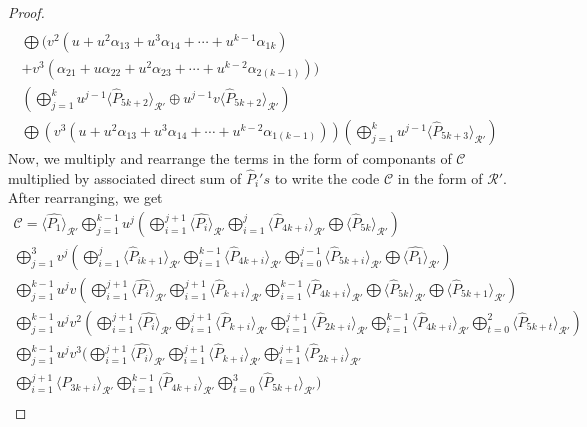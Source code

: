 \documentclass{amsart}
\theoremstyle{definition}
\theoremstyle{remark}
\numberwithin{equation}{section}
\begin{document}
\begin{proof}
\begin{gather*}
     \\  \bigoplus (v^2(u + u^2\alpha_{13} + u^3\alpha_{14} + \cdots + u^{k-1}\alpha_{1k})
       \\+ v^3( \alpha_{21} + u\alpha_{22} + u^2\alpha_{23}  + \cdots + u^{k-2}\alpha_{2(k-1)})) \\
     \left( \bigoplus_{j=1}^{k}  u^{j-1}\langle \hat{P}_{5k+2} \rangle_{\mathcal{R}'}
      \oplus u^{j-1}v\langle \hat{P}_{5k+2} \rangle_{\mathcal{R}'}\right)
     \\  \bigoplus  (v^3(u + u^2\alpha_{13} + u^3\alpha_{14} + \cdots + u^{k-2}\alpha_{1(k-1)}))
     \left( \bigoplus_{j=1}^{k}  u^{j-1}\langle \hat{P}_{5k+3} \rangle_{\mathcal{R}'}\right)
		\end{gather*}
{Now, we multiply and rearrange the terms in the form of componants of $\mathcal{C}$ multiplied by associated direct sum of $\hat{P}_{i}'s$ to write the code $\mathcal{C}$ in the form of $\mathcal{R}'.$ After rearranging, we get}
 \allowdisplaybreaks
    \begin{gather*}
        \mathcal{C} = \langle \hat{P_{1}} \rangle_{\mathcal{R}'} \bigoplus_{j=1}^{k-1} u^{j} \left( \bigoplus_{i=1}^{j+1} \langle \hat{P_i} \rangle_{\mathcal{R}'} \bigoplus_{i=1}^{j} \langle \hat{P}_{4k+i} \rangle_{\mathcal{R}'} \bigoplus \langle \hat{P}_{5k} \rangle_{\mathcal{R}'}  \right) \\
         \bigoplus_{j=1}^{3} v^{j} \left( \bigoplus_{i=1}^{j} \langle \hat{P}_{ik+1} \rangle_{\mathcal{R}'} \bigoplus_{i=1}^{k-1} \langle \hat{P}_{4k+i} \rangle_{\mathcal{R}'} \bigoplus_{i=0}^{j-1} \langle \hat{P}_{5k+i} \rangle_{\mathcal{R}'} \bigoplus \langle \hat{P_{1}} \rangle_{\mathcal{R}'}  \right) \\
          \bigoplus_{j=1}^{k-1} u^{j}v \left( \bigoplus_{i=1}^{j+1} \langle \hat{P_{i}} \rangle_{\mathcal{R}'} \bigoplus_{i=1}^{j+1} \langle \hat{P}_{k+i} \rangle_{\mathcal{R}'} \bigoplus_{i=1}^{k-1} \langle \hat{P}_{4k+i} \rangle_{\mathcal{R}'} \bigoplus \langle \hat{P}_{5k} \rangle_{\mathcal{R}'} \bigoplus \langle \hat{P}_{5k+1} \rangle_{\mathcal{R}'}  \right) \\
           \bigoplus_{j=1}^{k-1} u^{j}v^2 \left( \bigoplus_{i=1}^{j+1} \langle \hat{P_{i}} \rangle_{\mathcal{R}'} \bigoplus_{i=1}^{j+1} \langle \hat{P}_{k+i} \rangle_{\mathcal{R}'}  \bigoplus_{i=1}^{j+1} \langle \hat{P}_{2k+i} \rangle_{\mathcal{R}'} \bigoplus_{i=1}^{k-1} \langle \hat{P}_{4k+i} \rangle_{\mathcal{R}'} \bigoplus_{t=0}^{2} \langle \hat{P}_{5k+t} \rangle_{\mathcal{R}'}   \right) \\
            \bigoplus_{j=1}^{k-1} u^{j}v^3 ( \bigoplus_{i=1}^{j+1} \langle \hat{P_{i}} \rangle_{\mathcal{R}'} \bigoplus_{i=1}^{j+1} \langle \hat{P}_{k+i} \rangle_{\mathcal{R}'}  \bigoplus_{i=1}^{j+1} \langle \hat{P}_{2k+i} \rangle_{\mathcal{R}'} \\ \bigoplus_{i=1}^{j+1} \langle \hat{P}_{3k+i} \rangle_{\mathcal{R}'} \bigoplus_{i=1}^{k-1} \langle \hat{P}_{4k+i} \rangle_{\mathcal{R}'} \bigoplus_{t=0}^{3} \langle \hat{P}_{5k+t} \rangle_{\mathcal{R}'}   ) \\

\end{gather*}
\end{proof}
\end{document}
